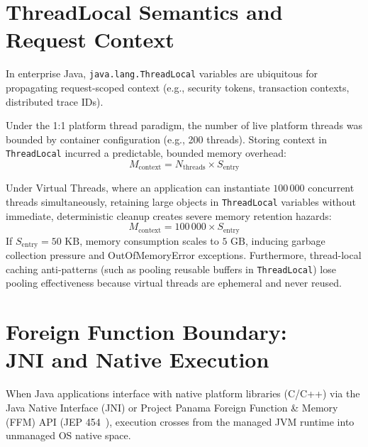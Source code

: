 \section{ThreadLocal Semantics and Request Context}
\label{sec:threadlocal-semantics}

In enterprise Java, \texttt{java.lang.ThreadLocal} variables are ubiquitous for propagating request-scoped context (e.g., security tokens, transaction contexts, distributed trace IDs).

Under the 1:1 platform thread paradigm, the number of live platform threads was bounded by container configuration (e.g., 200 threads). Storing context in \texttt{ThreadLocal} incurred a predictable, bounded memory overhead:
\begin{equation}
  M_{\text{context}} = N_{\text{threads}} \times S_{\text{entry}}
\end{equation}

Under Virtual Threads, where an application can instantiate $100\,000$ concurrent threads simultaneously, retaining large objects in \texttt{ThreadLocal} variables without immediate, deterministic cleanup creates severe memory retention hazards:
\begin{equation}
  M_{\text{context}} = 100\,000 \times S_{\text{entry}}
\end{equation}
If $S_{\text{entry}} = 50\text{ KB}$, memory consumption scales to $5\text{ GB}$, inducing garbage collection pressure and OutOfMemoryError exceptions. Furthermore, thread-local caching anti-patterns (such as pooling reusable buffers in \texttt{ThreadLocal}) lose pooling effectiveness because virtual threads are ephemeral and never reused.

\section[Foreign Function Boundary: JNI and Native Execution]{Foreign Function Boundary:\\ JNI and Native Execution}
\label{sec:jni-boundary}

When Java applications interface with native platform libraries (C/C++) via the Java Native Interface (JNI) or Project Panama Foreign Function \& Memory (FFM) API (JEP 454~\cite{JEP454}), execution crosses from the managed JVM runtime into unmanaged OS native space.

